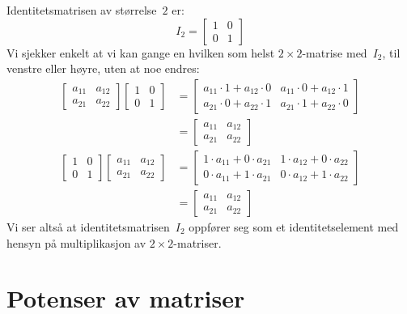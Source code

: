 \begin{ex}
Identitetsmatrisen av størrelse~$2$ er:
\[
I_2 =
\begin{bmatrix}
1 & 0 \\
0 & 1
\end{bmatrix}
\]
Vi sjekker enkelt at vi kan gange en hvilken som helst
$2 \times 2$-matrise med~$I_2$, til venstre eller høyre, uten at noe
endres:
\begin{align*}
\begin{bmatrix}
a_{11} & a_{12} \\
a_{21} & a_{22}
\end{bmatrix}
\begin{bmatrix}
1 & 0 \\
0 & 1
\end{bmatrix}
&=
\begin{bmatrix}
a_{11} \cdot 1 + a_{12} \cdot 0 &
a_{11} \cdot 0 + a_{12} \cdot 1 \\
a_{21} \cdot 0 + a_{22} \cdot 1 &
a_{21} \cdot 1 + a_{22} \cdot 0
\end{bmatrix}
\\
&=
\begin{bmatrix}
a_{11} & a_{12} \\
a_{21} & a_{22}
\end{bmatrix}
\\[4pt]
\begin{bmatrix}
1 & 0 \\
0 & 1
\end{bmatrix}
\begin{bmatrix}
a_{11} & a_{12} \\
a_{21} & a_{22}
\end{bmatrix}
&=
\begin{bmatrix}
1 \cdot a_{11} + 0 \cdot a_{21} &
1 \cdot a_{12} + 0 \cdot a_{22} \\
0 \cdot a_{11} + 1 \cdot a_{21} &
0 \cdot a_{12} + 1 \cdot a_{22}
\end{bmatrix}
\\
&=
\begin{bmatrix}
a_{11} & a_{12} \\
a_{21} & a_{22}
\end{bmatrix}
\end{align*}
Vi ser altså at identitetsmatrisen~$I_2$ oppfører seg som et
identitetselement med hensyn på multiplikasjon av
$2 \times 2$-matriser.
\end{ex}


\section*{Potenser av matriser}

